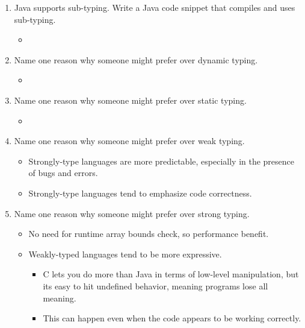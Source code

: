 \documentclass[12pt,a4paper]{article}
\begin{document}
\begin{enumerate}
\begin{itemize}
      \item[] 
    \end{itemize}
    \clearpage
    \item Java supports sub-typing. Write a Java code snippet that compiles and uses sub-typing. %
    \begin{itemize}
      \item 
    \end{itemize} 
    \item Name one reason why someone might prefer  over dynamic typing. %
    \begin{itemize}
      \item 
    \end{itemize}
    \item Name one reason why someone might prefer  over static typing. %
    \begin{itemize}
      \item 
    \end{itemize}
    \item Name one reason why someone might prefer  over weak typing. %
    \begin{itemize}
      \item Strongly-type languages are more predictable, especially in the presence of bugs and errors.
      \item Strongly-type languages tend to emphasize code correctness.
    \end{itemize}
    \item Name one reason why someone might prefer  over strong typing. %
    \begin{itemize}
      \item No need for runtime array bounds check, so performance benefit.
      \item Weakly-typed languages tend to be more expressive. 
      \begin{itemize}
        \item C lets you do more than Java in terms of low-level manipulation, but its easy to hit undefined behavior, meaning programs lose all meaning.
        \item This can happen even when the code appears to be working correctly.
      \end{itemize}
    \end{itemize}
  \end{enumerate}
\end{document}

